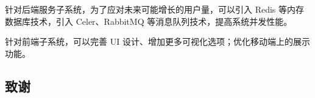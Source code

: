 \documentclass[a4paper,AutoFakeBold,oneside,12pt]{book}
\begin{document}
针对后端服务子系统，为了应对未来可能增长的用户量，可以引入 Redis 等内存数据库技术，引入 Celer、RabbitMQ 等消息队列技术，提高系统并发性能。

针对前端子系统，可以完善 UI 设计、增加更多可视化选项；优化移动端上的展示功能。


\begin{nopagenumber}
	\clearpage{}
	

	\clearpage
	\chapter{致\qquad{}谢}
	\normalsize\thankwords

\end{nopagenumber}

% 


% 
\end{document}
